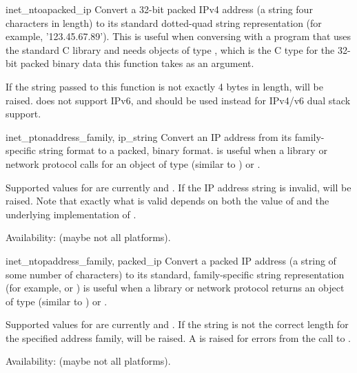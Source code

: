 \begin{funcdesc}{inet_ntoa}{packed_ip}
Convert a 32-bit packed IPv4 address (a string four characters in
length) to its standard dotted-quad string representation (for
example, '123.45.67.89').  This is useful when conversing with a
program that uses the standard C library and needs objects of type
, which is the C type for the 32-bit packed
binary data this function takes as an argument.

If the string passed to this function is not exactly 4 bytes in
length,  will be raised.
 does not support IPv6, and
 should be used instead for IPv4/v6 dual stack
support.
\end{funcdesc}

\begin{funcdesc}{inet_pton}{address_family, ip_string}
Convert an IP address from its family-specific string format to a packed,
binary format.
 is useful when a library or network protocol calls for
an object of type  (similar to )
or .

Supported values for  are currently
 and .
If the IP address string  is invalid,
 will be raised. Note that exactly what is valid
depends on both the value of  and the underlying
implementation of .

Availability: \UNIX{} (maybe not all platforms).
\end{funcdesc}

\begin{funcdesc}{inet_ntop}{address_family, packed_ip}
Convert a packed IP address (a string of some number of characters) to
its standard, family-specific string representation (for example,
 or )
 is useful when a library or network protocol returns
an object of type  (similar to )
or .

Supported values for  are currently
 and .
If the string  is not the correct length for the
specified address family,  will be raised.  A
 is raised for errors from the call to
.

Availability: \UNIX{} (maybe not all platforms).
\end{funcdesc}

